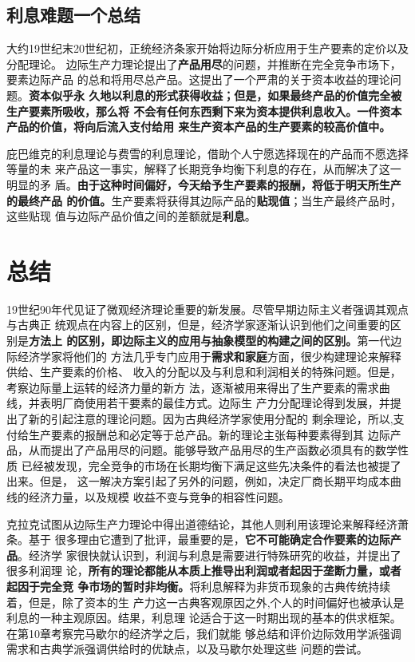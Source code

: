 \subsection{利息难题一个总结}

大约19世纪末20世纪初，正统经济条家开始将边际分析应用于生产要素的定价以及分配理论。
边际生产力理论提出了\textbf{产品用尽}的问题，并推断在完全竞争市场下，要素边际产品
的总和将用尽总产品。这提出了一个严肃的关于资本收益的理论问题。\textbf{资本似乎永
  久地以利息的形式获得收益；但是，如果最终产品的价值完全被生产要素所吸收，那么将
  不会有任何东西剩下来为资本提供利息收入。一件资本产品的价值，将向后流入支付给用
  来生产资本产品的生产要素的较高价值中。}

庇巴维克的利息理论与费雪的利息理论，借助个人宁愿选择现在的产品而不愿选择等量的未
来产品这一事实，解释了长期竞争均衡下利息的存在，从而解决了这一明显的矛
盾。\textbf{由于这种时间偏好，今天给予生产要素的报酬，将低于明天所生产的最终产品
  的价值。}生产要素将获得其边际产品的\textbf{贴现值}；当生产最终产品时，这些贴现
值与边际产品价值之间的差额就是\textbf{利息}。

\section{总结}

19世纪90年代见证了微观经济理论重要的新发展。尽管早期边际主义者强调其观点与古典正
统观点在内容上的区别，但是，经济学家逐渐认识到他们之间重要的区别是\textbf{方法上
  的区别，即边际主义的应用与抽象模型的构建之间的区别。}第一代边际经济学家将他们的
方法几乎专门应用于\textbf{需求和家庭}方面，很少构建理论来解释供给、生产要素的价格、
收入的分配以及与利息和利润相关的特殊问题。但是，考察边际量上运转的经济力量的新方
法，逐渐被用来得出了生产要素的需求曲线，并表明厂商使用若干要素的最佳方式。边际生
产力分配理论得到发展，并提出了新的引起注意的理论问题。因为古典经济学家使用分配的
剩余理论，所以,支付给生产要素的报酬总和必定等于总产品。新的理论主张每种要素得到其
边际产品，从而提出了产品用尽的问题。能够导致产品用尽的生产函数必须具有的数学性质
已经被发现，完全竞争的市场在长期均衡下满足这些先决条件的看法也被提了出来。但是，
这一解决方案引起了另外的问题，例如，决定厂商长期平均成本曲线的经济力量，以及规模
收益不变与竞争的相容性问题。

克拉克试图从边际生产力理论中得出道德结论，其他人则利用该理论来解释经济萧条。基于
很多理由它遭到了批评，最重要的是，\textbf{它不可能确定合作要素的边际产品}。经济学
家很快就认识到，利润与利息是需要进行特殊研究的收益，并提出了很多利润理
论，\textbf{所有的理论都能从本质上推导出利润或者起因于垄断力量，或者起因于完全竞
  争市场的暂时非均衡。}将利息解释为非货币现象的古典传统持续着，但是，除了资本的生
产力这一古典客观原因之外,个人的时间偏好也被承认是利息的一种主观原因。结果，利息理
论适合于这一时期出现的基本的供求框架。在第10章考察完马歇尔的经济学之后，我们就能
够总结和评价边际效用学派强调需求和古典学派强调供给时的优缺点，以及马歇尔处理这些
问题的尝试。




